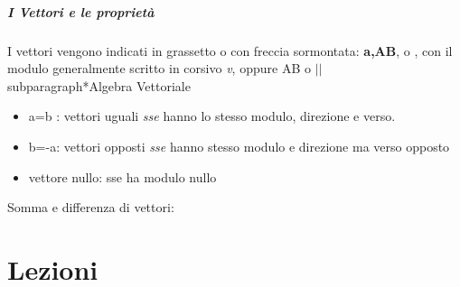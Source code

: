 \documentclass[12pt, a4paper, openany]{book}
\begin{document}
\paragraph*{I Vettori e le proprietà}
I vettori vengono indicati in grassetto o con freccia sormontata: \textbf{a,AB},  o , con il modulo generalmente scritto in corsivo \emph{v}, oppure AB o $|$$|$
\\subparagraph*{Algebra Vettoriale}
\begin{itemize}
    \item a=b : vettori uguali \emph{sse} hanno lo stesso modulo, direzione e verso.
    \item b=-a: vettori opposti \emph{sse} hanno stesso modulo e direzione ma verso opposto
    \item vettore nullo: sse ha modulo nullo
\end{itemize}
Somma e differenza di vettori:

\chapter{Lezioni}
\end{document}
